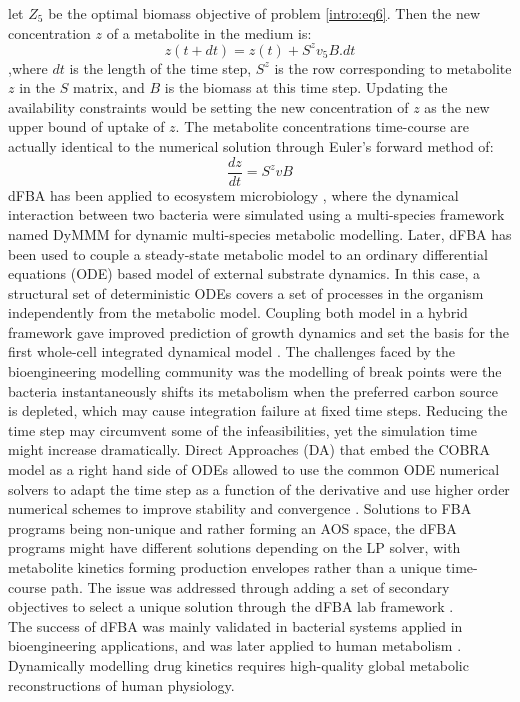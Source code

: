 let $Z_{5}$ be the optimal biomass objective of problem \ref{intro:eq6}. Then the new concentration $z$ of a metabolite in the medium is:
\begin{equation}
z(t+dt)=z(t)+S^{z}v_5B.dt 
\end{equation}
,where $dt$ is the length of the time step, $S^{z}$ is the row corresponding to metabolite $z$ in the $S$ matrix, and $B$ is the biomass at this time step. Updating the availability constraints would be setting the new concentration of $z$ as the new upper bound of uptake of $z$. The metabolite concentrations time-course are actually identical to the numerical solution through Euler's forward method of:
\begin{equation}
\frac{dz}{dt}= S^{z}vB
\end{equation}
dFBA has been applied to ecosystem microbiology \cite{zhuang2011genome}, where the dynamical interaction between two bacteria were simulated using a multi-species framework named DyMMM for dynamic multi-species metabolic modelling. Later, dFBA has been used to couple a steady-state metabolic model to an ordinary differential equations (ODE) based model of external substrate dynamics. In this case, a structural set of deterministic ODEs covers a set of processes in the organism independently from the metabolic model. Coupling both model in a hybrid framework gave improved prediction of growth dynamics \cite{covert2008integrating} and set the basis for the first whole-cell integrated dynamical model \cite{karr2012whole}. The challenges faced by the bioengineering modelling community was the modelling of break points were the bacteria instantaneously shifts its metabolism when the preferred carbon source is depleted, which may cause integration failure at fixed time steps. Reducing the time step may circumvent some of the infeasibilities, yet the simulation time might increase dramatically. Direct Approaches (DA) that embed the COBRA model as a right hand side of ODEs allowed to use the common ODE numerical solvers to adapt the time step as a function of the derivative and use higher order numerical schemes to improve stability and convergence \cite{hanly2011dynamic,zhuang2011genome}. Solutions to FBA programs being non-unique and rather forming an AOS space, the dFBA programs might have different solutions depending on the LP solver, with metabolite kinetics forming production envelopes rather than a unique time-course path. The issue was addressed through adding a set of secondary objectives to select a unique solution through the dFBA lab framework \cite{gomez2014dfbalab,hoffner2013reliable}.\\
The success of dFBA was mainly validated in bacterial systems applied in bioengineering applications, and was later applied to human metabolism \cite{oyaas2017genome}. Dynamically modelling drug kinetics requires high-quality global metabolic reconstructions of human physiology. 
